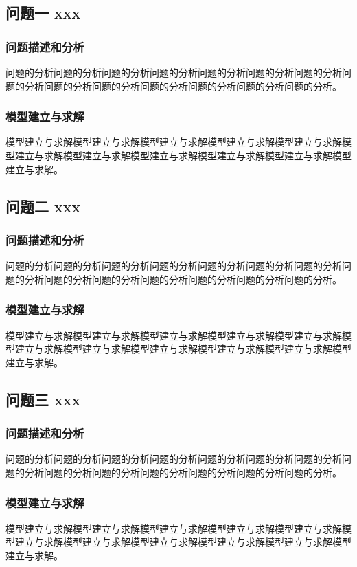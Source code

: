\documentclass[bwprint]{gmcmthesis}
\begin{document}
\subsection{问题一 xxx}
\subsubsection{问题描述和分析}
问题的分析问题的分析问题的分析问题的分析问题的分析问题的分析问题的分析问题的分析问题的分析问题的分析问题的分析问题的分析问题的分析问题的分析。
\subsubsection{模型建立与求解}
模型建立与求解模型建立与求解模型建立与求解模型建立与求解模型建立与求解模型建立与求解模型建立与求解模型建立与求解模型建立与求解模型建立与求解模型建立与求解。


\subsection{问题二 xxx}
\subsubsection{问题描述和分析}
问题的分析问题的分析问题的分析问题的分析问题的分析问题的分析问题的分析问题的分析问题的分析问题的分析问题的分析问题的分析问题的分析问题的分析。
\subsubsection{模型建立与求解}
模型建立与求解模型建立与求解模型建立与求解模型建立与求解模型建立与求解模型建立与求解模型建立与求解模型建立与求解模型建立与求解模型建立与求解模型建立与求解。

\subsection{问题三 xxx}
\subsubsection{问题描述和分析}
问题的分析问题的分析问题的分析问题的分析问题的分析问题的分析问题的分析问题的分析问题的分析问题的分析问题的分析问题的分析问题的分析问题的分析。
\subsubsection{模型建立与求解}
模型建立与求解模型建立与求解模型建立与求解模型建立与求解模型建立与求解模型建立与求解模型建立与求解模型建立与求解模型建立与求解模型建立与求解模型建立与求解。
\end{document}
